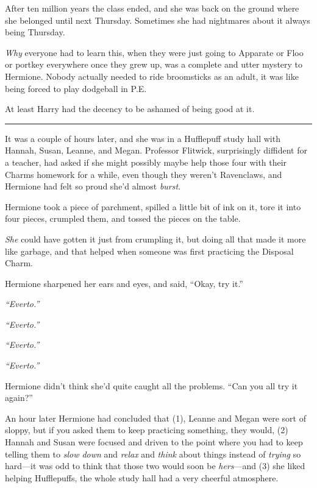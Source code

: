 After ten million years the class ended, and she was back on the ground
where she belonged until next Thursday. Sometimes she had nightmares
about it always being Thursday.

\emph{Why} everyone had to learn this, when they were just going to
Apparate or Floo or portkey everywhere once they grew up, was a complete
and utter mystery to Hermione. Nobody actually needed to ride
broomsticks as an adult, it was like being forced to play dodgeball in
P.E.

At least Harry had the decency to be ashamed of being good at it.

\begin{center}\rule{3in}{0.4pt}\end{center}

It was a couple of hours later, and she was in a Hufflepuff study hall
with Hannah, Susan, Leanne, and Megan. Professor Flitwick, surprisingly
diffident for a teacher, had asked if she might possibly maybe help
those four with their Charms homework for a while, even though they
weren't Ravenclaws, and Hermione had felt so proud she'd almost
\emph{burst}.

Hermione took a piece of parchment, spilled a little bit of ink on it,
tore it into four pieces, crumpled them, and tossed the pieces on the
table.

\emph{She} could have gotten it just from crumpling it, but doing all
that made it more like garbage, and that helped when someone was first
practicing the Disposal Charm.

Hermione sharpened her ears and eyes, and said, ``Okay, try it.''

\emph{``Everto.''}

\emph{``Everto.''}

\emph{``Everto.''}

\emph{``Everto.''}

Hermione didn't think she'd quite caught all the problems. ``Can you all
try it again?''

An hour later Hermione had concluded that (1), Leanne and Megan were
sort of sloppy, but if you asked them to keep practicing something, they
would, (2) Hannah and Susan were focused and driven to the point where
you had to keep telling them to \emph{slow down} and \emph{relax} and
\emph{think} about things instead of \emph{trying} so hard---it was odd
to think that those two would soon be \emph{hers}---and (3) she liked
helping Hufflepuffs, the whole study hall had a very cheerful
atmosphere.

